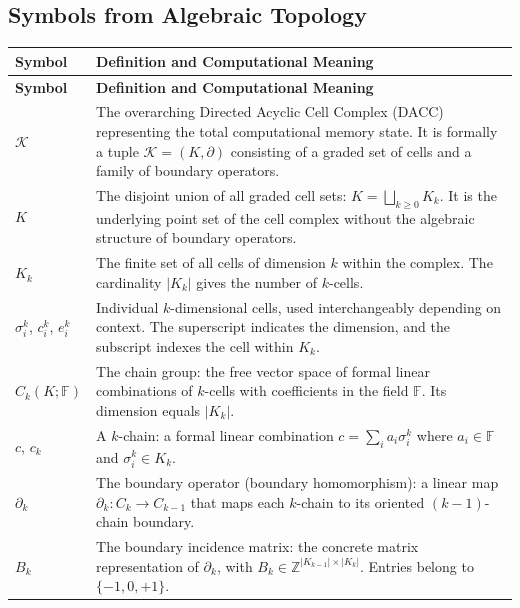 \documentclass[manuscript, nonacm, review=false]{acmart}
\theoremstyle{definition}
\theoremstyle{plain}
\newcommand{\Z}{\mathbb{Z}}
\newcommand{\K}{\mathcal{K}}
\newcommand{\F}{\mathbb{F}}
\begin{document}
\subsection{Symbols from Algebraic Topology}
\label{subsec:symbols_topology}

\begin{longtable}{@{}p{2.8cm}p{10cm}@{}}
\toprule
\textbf{Symbol} & \textbf{Definition and Computational Meaning} \\
\midrule
\endfirsthead
\toprule
\textbf{Symbol} & \textbf{Definition and Computational Meaning} \\
\midrule
\endhead
\bottomrule
\endfoot

$\K$ & The overarching Directed Acyclic Cell Complex (DACC) representing the total computational memory state. It is formally a tuple $\K = (K, \partial)$ consisting of a graded set of cells and a family of boundary operators. \\

$K$ & The disjoint union of all graded cell sets: $K = \bigsqcup_{k \geq 0} K_k$. It is the underlying point set of the cell complex without the algebraic structure of boundary operators. \\

$K_k$ & The finite set of all cells of dimension $k$ within the complex. The cardinality $|K_k|$ gives the number of $k$-cells. \\

$\sigma_i^k$, $c_i^k$, $e_i^k$ & Individual $k$-dimensional cells, used interchangeably depending on context. The superscript indicates the dimension, and the subscript indexes the cell within $K_k$. \\

$C_k(K; \F)$ & The chain group: the free vector space of formal linear combinations of $k$-cells with coefficients in the field $\F$. Its dimension equals $|K_k|$. \\

$c$, $c_k$ & A $k$-chain: a formal linear combination $c = \sum_{i} a_i \sigma_i^k$ where $a_i \in \F$ and $\sigma_i^k \in K_k$. \\

$\partial_k$ & The boundary operator (boundary homomorphism): a linear map $\partial_k: C_k \to C_{k-1}$ that maps each $k$-chain to its oriented $(k-1)$-chain boundary. \\

$B_k$ & The boundary incidence matrix: the concrete matrix representation of $\partial_k$, with $B_k \in \Z^{|K_{k-1}| \times |K_k|}$. Entries belong to $\{-1, 0, +1\}$. \\


\end{longtable}
\end{document}
